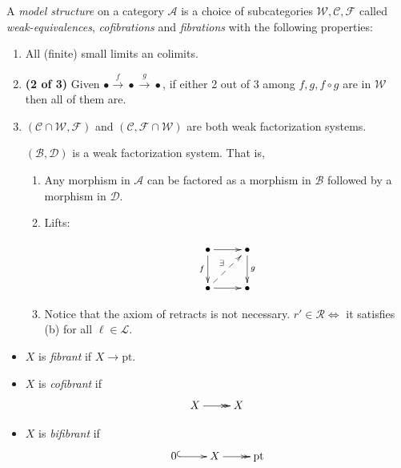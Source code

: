 \begin{definition}[Lecture]
\label{definition-lecture}
A {\it model structure} on a category
$\mathcal{A}$
is a choice of subcategories
$\mathcal{W},\mathcal{C},\mathcal{F}$
called {\it weak-equivalences}, {\it
cofibrations} and {\it fibrations}
with the following properties:

\begin{enumerate}
\item[0.] All (finite) small limits an
colimits.

\item \textbf{(2 of 3)} Given
$\bullet\overset{f}{\to}\bullet\overset{g}
{\to}\bullet$,
if either 2 out of 3 among $f,g,f\circ g$
are in $\mathcal{W}$ then all of them are.

\item
$(\mathcal{C}\cap\mathcal{W},\mathcal{F})$
and
$(\mathcal{C},\mathcal{F}\cap\mathcal{W})$
are both weak factorization systems.

$(\mathcal{B},\mathcal{D})$ is a weak
factorization system. That is,

\begin{enumerate}
\item Any morphism in $\mathcal{A}$ can be
factored
as a morphism in $\mathcal{B}$
followed by a morphism in $\mathcal{D}$.

\item Lifts:

$$
\xymatrix{
\bullet\ar[d]_{f}\ar[r]&\bullet\ar[d]^{g}\\
\bullet\ar@{-->}[ur]^{\exists}\ar[r]&\bullet
}
$$

\item[(c')] Notice that the axiom of retracts
is not necessary. $r'\in\mathcal{R}\iff$ it
satisfies (b) for all $\ell\in\mathcal{L}$.
\end{enumerate}
\end{enumerate}
\end{definition}

\begin{definition}
\label{definition-item}
\begin{itemize}
\item $X$ is {\it fibrant} if
$X\to\text{pt}$.
\item $X$ is {\it cofibrant} if
$$
\xymatrix{
X\ar@{->>}[r]&X
}
$$
\item $X$ is {\it bifibrant} if
$$
\xymatrix{
0\ar@{^{(}->}[r]&X\ar@{->>}[r]&\text{pt}
}
$$
\end{itemize}
\end{definition}

